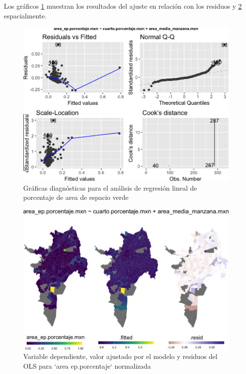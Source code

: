 \documentclass[12pt,]{book}
\begin{document}
Los gráficos \ref{fig:diagn-lm-areaep-sel} muestran los resultados del
ajuste en relación con los residuos y \ref{fig:mapas-lm-areaep}
espacialmente.

\begin{figure}
\includegraphics[width=1\linewidth]{tesis-unigis_files/figure-latex/diagn-lm-areaep-sel-1} \caption{Gráficas diagnósticas para el análisis de regresión lineal de porcentaje de area de espacio verde}\label{fig:diagn-lm-areaep-sel}
\end{figure}

\begin{figure}
\includegraphics[width=1\linewidth]{tesis-unigis_files/figure-latex/mapas-lm-areaep-1} \caption{Variable dependiente, valor ajustado por el modelo y residuos del OLS para `area ep.porcentaje` normalizada}\label{fig:mapas-lm-areaep}
\end{figure}
\end{document}
